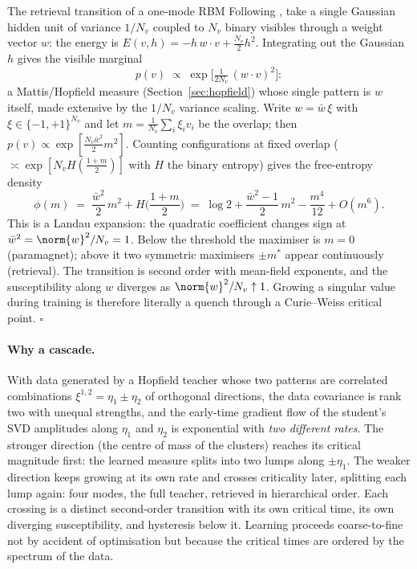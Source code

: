 \begin{toolbox}{The retrieval transition of a one-mode RBM}
Following \citet{bachtis2024cascade}, take a single Gaussian hidden unit
of variance $1/N_v$ coupled to $N_v$ binary visibles through a weight
vector $w$: the energy is
$E(v, h) = -h\, w \cdot v + \tfrac{N_v}{2} h^2$. Integrating out the
Gaussian $h$ gives the visible marginal
\begin{equation*}
  p(v) \;\propto\; \exp\!\Big[ \tfrac{1}{2 N_v}\, (w \cdot v)^2 \Big] :
\end{equation*}
a Mattis/Hopfield measure (Section~\ref{sec:hopfield}) whose single
pattern is $w$ itself, made extensive by the $1/N_v$ variance scaling.
Write $w = \bar w\, \xi$ with $\xi \in \{-1,+1\}^{N_v}$ and let
$m = \tfrac{1}{N_v} \sum_i \xi_i v_i$ be the overlap; then
$p(v) \propto \exp[\tfrac{N_v \bar w^2}{2} m^2]$. Counting configurations
at fixed overlap ($\asymp \exp[N_v H(\tfrac{1+m}{2})]$ with $H$ the
binary entropy) gives the free-entropy density
\begin{equation*}
  \phi(m) \;=\; \frac{\bar w^2}{2}\, m^2 + H\!\Big(\frac{1+m}{2}\Big)
  \;=\; \log 2 + \frac{\bar w^2 - 1}{2}\, m^2 - \frac{m^4}{12} + O(m^6).
\end{equation*}
This is a Landau expansion: the quadratic coefficient changes sign at
$\bar w^2 = \norm{w}^2 / N_v = 1$. Below the threshold the maximiser is
$m = 0$ (paramagnet); above it two symmetric maximisers $\pm m^*$ appear
continuously (retrieval). The transition is second order with mean-field
exponents, and the susceptibility along $w$ diverges as
$\norm{w}^2/N_v \uparrow 1$. Growing a singular value during training is
therefore literally a quench through a Curie--Weiss critical point.
\hfill$\square$
\end{toolbox}

\paragraph{Why a cascade.} With data generated by a Hopfield teacher
whose two patterns are correlated combinations
$\xi^{1,2} = \eta_1 \pm \eta_2$ of orthogonal directions, the data
covariance is rank two with unequal strengths, and the early-time
gradient flow of the student's SVD amplitudes along $\eta_1$ and $\eta_2$
is exponential with \emph{two different rates}. The stronger direction
(the centre of mass of the clusters) reaches its critical magnitude
first: the learned measure splits into two lumps along $\pm\eta_1$. The
weaker direction keeps growing at its own rate and crosses criticality
later, splitting each lump again: four modes, the full teacher, retrieved
in hierarchical order. Each crossing is a distinct second-order
transition with its own critical time, its own diverging susceptibility,
and hysteresis below it. Learning proceeds coarse-to-fine not by accident
of optimisation but because the critical times are ordered by the
spectrum of the data.

